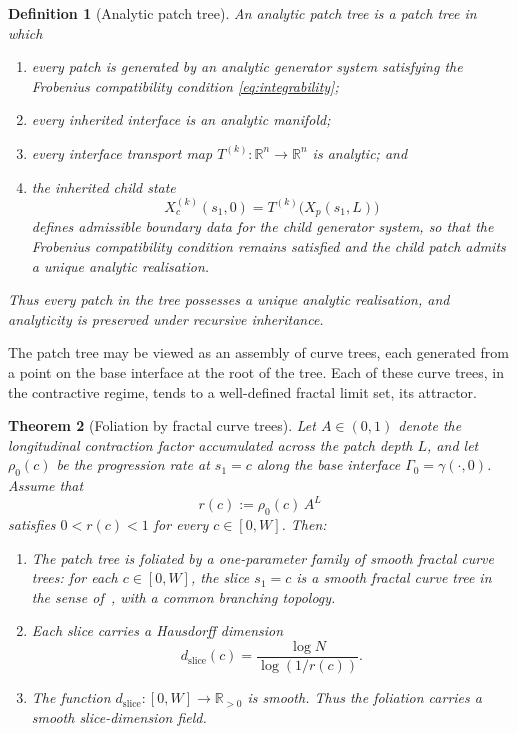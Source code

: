 \documentclass[11pt,a4paper]{article}
\newtheorem{theorem}{Theorem}[section]
\newtheorem{definition}[theorem]{Definition}
\begin{document}
\begin{definition}[Analytic patch tree]
An \emph{analytic patch tree} is a patch tree in which

\begin{enumerate}
\item every patch is generated by an analytic generator system
      satisfying the Frobenius compatibility condition
      \eqref{eq:integrability};

\item every inherited interface is an analytic manifold;

\item every interface transport map
      \(T^{(k)} : \mathbb{R}^n \rightarrow \mathbb{R}^n\)
      is analytic; and

\item the inherited child state
      \[
      X^{(k)}_c(s_1,0)
      =
      T^{(k)}
      \bigl(
      X_p(s_1,L)
      \bigr)
      \]
      defines admissible boundary data for the child generator
      system, so that the Frobenius compatibility condition remains
      satisfied and the child patch admits a unique analytic
      realisation.
\end{enumerate}

Thus every patch in the tree possesses a unique analytic realisation,
and analyticity is preserved under recursive inheritance.
\end{definition}

The patch tree may be viewed as an assembly of curve trees, each generated from a point
on the base interface at the root of the tree. Each of these curve trees, 
in the contractive regime, tends to a well-defined fractal limit set, its attractor.

\begin{theorem}[Foliation by fractal curve trees]
\label{prop:foliation}
Let $A \in (0,1)$ denote the longitudinal contraction factor
accumulated across the patch depth $L$, and let $\rho_0(c)$ be the
progression rate at $s_1=c$ along the base interface
$\Gamma_0 = \gamma(\cdot,0)$. Assume that
\[
    r(c) := \rho_0(c)\,A^L
\]
satisfies $0 < r(c) < 1$ for every $c \in [0,W]$. Then:
\begin{enumerate}[label=(\roman*)]
\item The patch tree is foliated by a one-parameter family of
    smooth fractal curve trees: for each $c \in [0,W]$, the slice
    $s_1 = c$ is a smooth fractal curve tree in the sense
    of~\cite{mulder2026}, with a common branching topology.
\item Each slice carries a Hausdorff dimension
\begin{equation}
    d_{\mathrm{slice}}(c)
    =
    \frac{\log N}{\log(1/r(c))}.
    \label{eq:dimension_spectrum}
\end{equation}
\item The function
    $d_{\mathrm{slice}} : [0,W] \to \mathbb{R}_{>0}$
    is smooth. Thus the foliation carries a smooth
    \emph{slice-dimension field}.
\end{enumerate}
\end{theorem}
\end{document}
